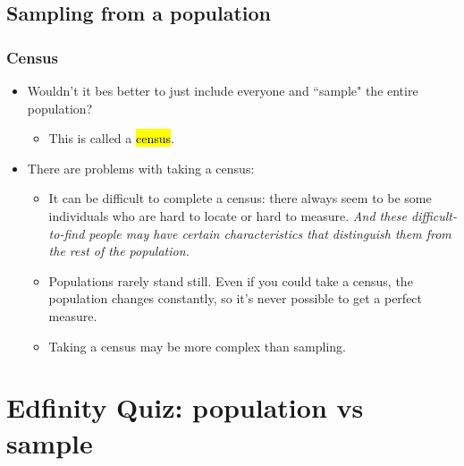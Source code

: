 \documentclass[slidestop,compress,mathserif]{beamer}
\begin{document}

\subsection{Sampling from a population}


\begin{frame}
	\frametitle{Census}

	\begin{itemize}

	\item Wouldn't it bes better to just include everyone and ``sample" the entire population? 

	\begin{itemize}
	\item This is called a \hl{census}.
	\end{itemize}

	\pause

	\item There are problems with taking a census:

	\begin{itemize}
	\item It can be difficult to complete a census: there always seem to be some individuals who are hard to locate or hard to measure. \textit{And these difficult-to-find people may have certain characteristics that distinguish them from the rest of the population.}
	\item Populations rarely stand still. Even if you could take a census, the population changes constantly, so it's never possible to get a perfect measure.
	\item Taking a census may be more complex than sampling.
	\end{itemize}

	\end{itemize}

\end{frame}

\section{Edfinity Quiz: population vs sample}
\end{document}
